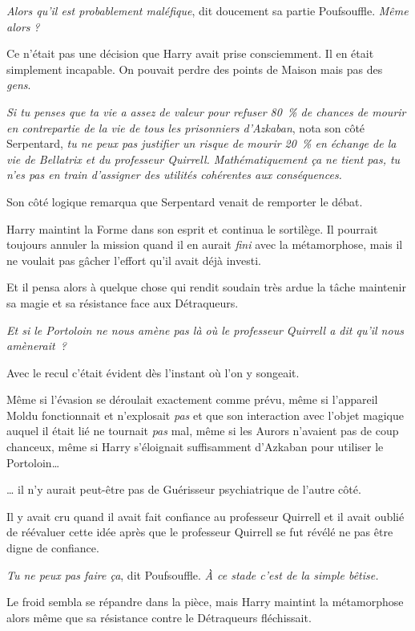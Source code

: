 \emph{Alors qu'il est probablement maléfique}, dit doucement sa partie Poufsouffle.
\emph{Même alors} \emph{?}

Ce n'était pas une décision que Harry avait prise consciemment.
Il en était simplement incapable.
On pouvait perdre des points de Maison mais pas des \emph{gens}.

\emph{Si tu penses que ta vie a assez de valeur pour refuser 80~\% de chances de mourir en contrepartie de la vie de tous les prisonniers d'Azkaban}, nota son côté Serpentard, \emph{tu ne peux pas justifier un risque de mourir 20~\% en échange de la vie de Bellatrix et du professeur Quirrell.
Mathématiquement ça ne tient pas, tu n'es pas en train d'assigner des utilités cohérentes aux conséquences.}

Son côté logique remarqua que Serpentard venait de remporter le débat.

Harry maintint la Forme dans son esprit et continua le sortilège.
Il pourrait toujours annuler la mission quand il en aurait \emph{fini} avec la métamorphose, mais il ne voulait pas gâcher l'effort qu'il avait déjà investi.

Et il pensa alors à quelque chose qui rendit soudain très ardue la tâche maintenir sa magie et sa résistance face aux Détraqueurs.

\emph{Et si le Portoloin ne nous amène pas là où le professeur Quirrell a dit qu'il nous amènerait~?}

Avec le recul c'était évident dès l'instant où l'on y songeait.

Même si l'évasion se déroulait exactement comme prévu, même si l'appareil Moldu fonctionnait et n'explosait \emph{pas} et que son interaction avec l'objet magique auquel il était lié ne tournait \emph{pas} mal, même si les Aurors n'avaient pas de coup chanceux, même si Harry s'éloignait suffisamment d'Azkaban pour utiliser le Portoloin…

… il n'y aurait peut-être pas de Guérisseur psychiatrique de l'autre côté.

Il y avait cru quand il avait fait confiance au professeur Quirrell et il avait oublié de réévaluer cette idée après que le professeur Quirrell se fut révélé ne pas être digne de confiance.

\emph{Tu ne peux pas faire ça}, dit Poufsouffle.
\emph{À ce stade c'est de la simple bêtise.}

Le froid sembla se répandre dans la pièce, mais Harry maintint la métamorphose alors même que sa résistance contre le Détraqueurs fléchissait.

